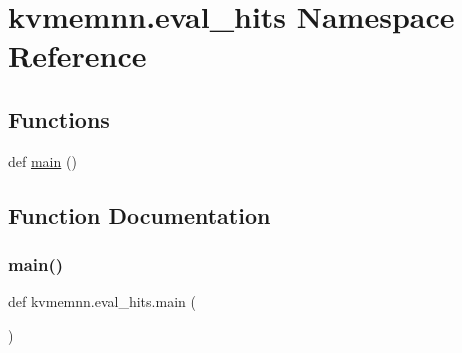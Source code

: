 \hypertarget{namespacekvmemnn_1_1eval__hits}{}\section{kvmemnn.\+eval\+\_\+hits Namespace Reference}
\label{namespacekvmemnn_1_1eval__hits}
\subsection*{Functions}
\begin{DoxyCompactItemize}
\item 
def \hyperlink{namespacekvmemnn_1_1eval__hits_a1df5812420600d93fdd4db358ad0e301}{main} ()
\end{DoxyCompactItemize}


\subsection{Function Documentation}
\mbox{\label{namespacekvmemnn_1_1eval__hits_a1df5812420600d93fdd4db358ad0e301}} 
\subsubsection{\texorpdfstring{main()}{main()}}
{\footnotesize\ttfamily def kvmemnn.\+eval\+\_\+hits.\+main (\begin{DoxyParamCaption}{ }\end{DoxyParamCaption})}

